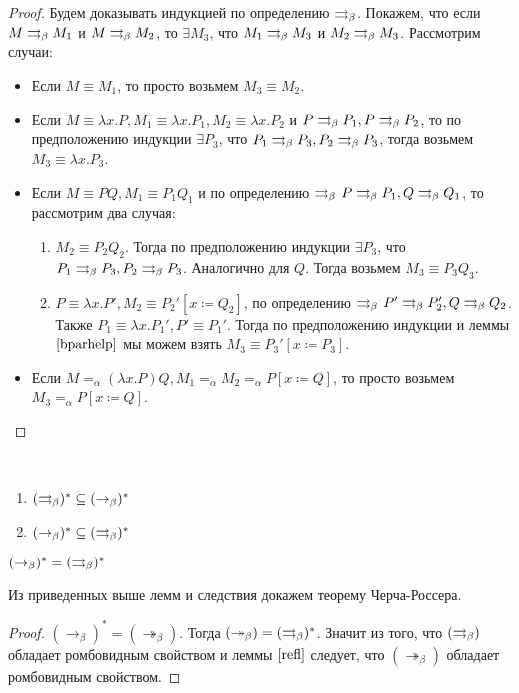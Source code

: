 \begin{proof}
	Будем доказывать индукцией по определению $\rightrightarrows_{\beta}$. Покажем, что если $M \rightrightarrows_{\beta} M_1$ и $M \rightrightarrows_{\beta} M_2$, то $\exists{}M_3$, что $M_1 \rightrightarrows_{\beta} M_3$ и $M_2 \rightrightarrows_{\beta} M_3$. Рассмотрим случаи:
	\begin{itemize}
		\item Если $M\equiv M_1$, то просто возьмем $M_3\equiv M_2$.
		\item Если $M\equiv \lambda{}x.P, M_1 \equiv \lambda{}x.P_1, M_2 \equiv \lambda{}x.P_2$ и $P \rightrightarrows_{\beta} P_1, P \rightrightarrows_{\beta} P_2$, то по предположению индукции 
		$\exists P_3$, что $P_1 \rightrightarrows_{\beta} P_3, P_2 \rightrightarrows_{\beta} P_3$, тогда возьмем $M_3\equiv \lambda{}x.P_3$.
		\item Если $M \equiv P Q, M_1 \equiv P_1 Q_1$ и по определению $\rightrightarrows_{\beta}$ $P \rightrightarrows_{\beta} P_1, Q \rightrightarrows_{\beta} Q_1$, то рассмотрим два случая:
		\begin{enumerate}
			\item $M_2 \equiv P_2 Q_2$. Тогда по предположению индукции $\exists P_3$, что $P_1 \rightrightarrows_{\beta} P_3, P_2 \rightrightarrows_{\beta} P_3$. Аналогично для $Q$. Тогда возьмем $M_3 \equiv P_3 Q_3$.
			\item $P\equiv \lambda {}x.P', M_2 \equiv P_2'[x\coloneqq{} Q_2]$, по определению $\rightrightarrows_{\beta}$ $P' \rightrightarrows_{\beta} P_2', Q \rightrightarrows_{\beta} Q_2$. Также $P_1 \equiv \lambda{}x.P_1', P' \equiv P_1'$. Тогда по предположению индукции и леммы $\ref{bparhelp}$ мы можем взять $M_3 \equiv P_3'[x \coloneqq P_3]$.
		\end{enumerate}
	\item Если $M =_\alpha (\lambda{}x.P)Q, M_1 =_\alpha M_2 =_\alpha P[x \coloneqq Q]$, то просто возьмем $M_3 =_\alpha P[x \coloneq Q]$.
	\end{itemize}
\end{proof}

\begin{lemma}
	\
	\begin{enumerate}
		\item $(\rightrightarrows_{\beta} )^{*} \subseteq (\to_{\beta})^{*}$
		\item $(\to_{\beta})^{*} \subseteq (\rightrightarrows_{\beta} )^{*}$
	\end{enumerate}
\end{lemma}

\begin{cons}
	$(\to_{\beta})^{*}=(\rightrightarrows_{\beta} )^{*}$
\end{cons}

Из приведенных выше лемм и следствия докажем теорему Черча-Россера.

\begin{proof}
	$(\to_{\beta})^{*} = (\twoheadrightarrow_{\beta})$. Тогда $(\twoheadrightarrow_{\beta})=(\rightrightarrows_{\beta} )^{*}$. Значит из того, что $(\rightrightarrows_{\beta} )$ обладает ромбовидным свойством и леммы $\ref{refl}$ следует, что $(\twoheadrightarrow_{\beta})$ обладает ромбовидным свойством.
\end{proof}

